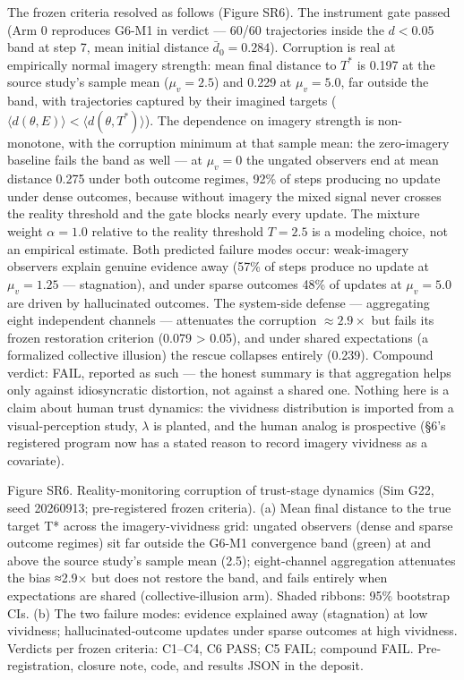 \documentclass[
]{article}
\begin{document}
The frozen criteria resolved as follows (Figure SR6). The instrument
gate passed (Arm 0 reproduces G6-M1 in verdict --- 60/60 trajectories
inside the \(d < 0.05\) band at step 7, mean initial distance
\(\bar{d}_0 = 0.284\)). Corruption is real at empirically normal imagery
strength: mean final distance to \(T^{*}\) is 0.197 at the source
study's sample mean (\(\mu_v = 2.5\)) and 0.229 at \(\mu_v = 5.0\), far
outside the band, with trajectories captured by their imagined targets
(\(\langle d(\theta, E)\rangle < \langle d(\theta, T^{*})\rangle\)). The
dependence on imagery strength is non-monotone, with the corruption
minimum at that sample mean: the zero-imagery baseline fails the band as
well --- at \(\mu_v = 0\) the ungated observers end at mean distance
0.275 under both outcome regimes, 92\% of steps producing no update
under dense outcomes, because without imagery the mixed signal never
crosses the reality threshold and the gate blocks nearly every update.
The mixture weight \(\alpha = 1.0\) relative to the reality threshold
\(T = 2.5\) is a modeling choice, not an empirical estimate. Both
predicted failure modes occur: weak-imagery observers explain genuine
evidence away (57\% of steps produce no update at \(\mu_v = 1.25\) ---
stagnation), and under sparse outcomes 48\% of updates at
\(\mu_v = 5.0\) are driven by hallucinated outcomes. The system-side
defense --- aggregating eight independent channels --- attenuates the
corruption \(\approx\)\(2.9\times\) but fails its frozen restoration
criterion (0.079 \textgreater{} 0.05), and under shared expectations (a
formalized collective illusion) the rescue collapses entirely (0.239).
Compound verdict: FAIL, reported as such --- the honest summary is that
aggregation helps only against idiosyncratic distortion, not against a
shared one. Nothing here is a claim about human trust dynamics: the
vividness distribution is imported from a visual-perception study,
\(\lambda\) is planted, and the human analog is prospective (§6's
registered program now has a stated reason to record imagery vividness
as a covariate).

Figure SR6. Reality-monitoring corruption of trust-stage dynamics (Sim
G22, seed 20260913; pre-registered frozen criteria). (a) Mean final
distance to the true target T* across the imagery-vividness grid:
ungated observers (dense and sparse outcome regimes) sit far outside the
G6-M1 convergence band (green) at and above the source study's sample
mean (2.5); eight-channel aggregation attenuates the bias {≈}{2.9×} but
does not restore the band, and fails entirely when expectations are
shared (collective-illusion arm). Shaded ribbons: 95\% bootstrap CIs.
(b) The two failure modes: evidence explained away (stagnation) at low
vividness; hallucinated-outcome updates under sparse outcomes at high
vividness. Verdicts per frozen criteria: C1--C4, C6 PASS; C5 FAIL;
compound FAIL. Pre-registration, closure note, code, and results JSON in
the deposit.
\end{document}
